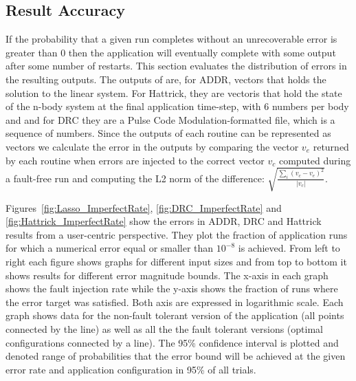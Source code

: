 \documentclass{sig-alternate}
\begin{document}

\subsection{Result Accuracy}
\label{sec:eval:acc}


If the probability that a given run completes without an unrecoverable error is greater than 0 then the application will eventually complete with some output after some number of restarts.
This section evaluates the distribution of errors in the resulting outputs.
The outputs of are, for ADDR, vectors that holds the solution to the linear system.
For Hattrick, they are vectoris that hold the state of the n-body system at the final application time-step, with 6 numbers per body
and and for DRC they are a Pulse Code Modulation-formatted file, which is a sequence of numbers.
Since the outputs of each routine can be represented as vectors we calculate the error in the outputs by comparing the vector $v_e$ returned by each routine when errors are injected to the correct vector $v_c$ computed during a fault-free run and computing the L2 norm of the difference: $\sqrt{\frac{\sum_{i} (v_c-v_e)^2}{\left| v_c \right|}}$.

Figures~\ref{fig:Lasso_ImperfectRate}, \ref{fig:DRC_ImperfectRate} and \ref{fig:Hattrick_ImperfectRate} show the errors in ADDR, DRC and Hattrick results from a user-centric perspective.
They plot the fraction of application runs for which a numerical error equal or smaller than $10^{-8}$ is achieved.
From left to right each figure shows graphs for different input sizes and from top to bottom it shows results for different error magnitude bounds.
The x-axis in each graph shows the fault injection rate while the y-axis shows the fraction of runs where the error target was satisfied.
Both axis are expressed in logarithmic scale.
Each graph shows data for the non-fault tolerant version of the application (all points connected by the line) as well as all the the fault tolerant versions (optimal configurations connected by a line).
The 95\% confidence interval is plotted and denoted range of probabilities that the error bound will be achieved at the given error rate and application configuration in 95\% of all trials.
\end{document}
